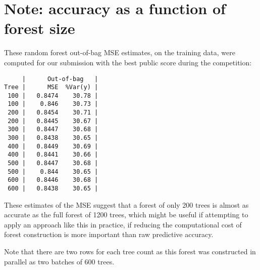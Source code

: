 \documentclass[12pt]{article}
\begin{document}
\section{Note: accuracy as a function of forest size}
\label{secTreeSize}

These random forest out-of-bag MSE estimates, on the training
data, were computed for our submission with the best public
score during the competition:

\begin{verbatim}
     |      Out-of-bag   |
Tree |      MSE  %Var(y) |
 100 |   0.8474    30.78 |
 100 |    0.846    30.73 |
 200 |   0.8454    30.71 |
 200 |   0.8445    30.67 |
 300 |   0.8447    30.68 |
 300 |   0.8438    30.65 |
 400 |   0.8449    30.69 |
 400 |   0.8441    30.66 |
 500 |   0.8447    30.68 |
 500 |    0.844    30.65 |
 600 |   0.8446    30.68 |
 600 |   0.8438    30.65 |
\end{verbatim}

These estimates of the MSE suggest that a forest of only 200 trees
is almost as accurate as the full forest of 1200 trees,
which might be useful if attempting to apply an approach
like this in practice, if reducing the computational cost of
forest construction is more important than raw predictive accuracy.

Note that there are two rows for each tree count as this forest was
constructed in parallel as two batches of 600 trees.
\end{document}
